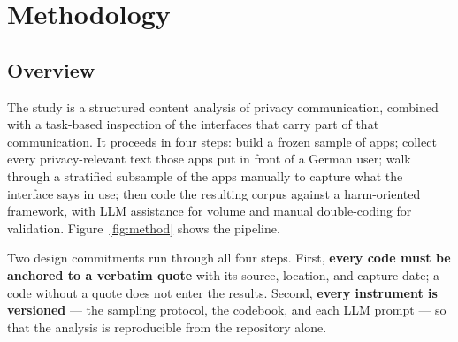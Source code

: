 \section{Methodology}
\label{sec:method}

\subsection{Overview}

The study is a structured content analysis of privacy communication, combined
with a task-based inspection of the interfaces that carry part of that
communication. It proceeds in four steps: build a frozen sample of apps; collect
every privacy-relevant text those apps put in front of a German user; walk
through a stratified subsample of the apps manually to capture what the
interface says in use; then code the resulting corpus against a harm-oriented
framework, with LLM assistance for volume and manual double-coding for
validation. Figure~\ref{fig:method} shows the pipeline.

Two design commitments run through all four steps. First, \textbf{every code
must be anchored to a verbatim quote} with its source, location, and capture
date; a code without a quote does not enter the results. Second, \textbf{every
instrument is versioned} --- the sampling protocol, the codebook, and each LLM
prompt --- so that the analysis is reproducible from the repository alone.


